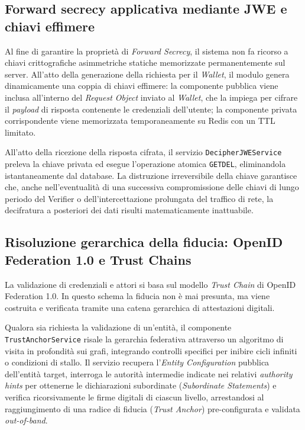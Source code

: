 \subsection{Forward secrecy applicativa mediante JWE e chiavi effimere}
Al fine di garantire la proprietà di \textit{Forward Secrecy}, il sistema non fa ricorso a chiavi crittografiche asimmetriche statiche memorizzate permanentemente sul server. All'atto della generazione della richiesta per il \textit{Wallet}, il modulo genera dinamicamente una coppia di chiavi effimere: la componente pubblica viene inclusa all'interno del \textit{Request Object} inviato al \textit{Wallet}, che la impiega per cifrare il \textit{payload} di risposta contenente le credenziali dell'utente; la componente privata corrispondente viene memorizzata temporaneamente su Redis con un TTL limitato. 

All'atto della ricezione della risposta cifrata, il servizio \texttt{DecipherJWEService} preleva la chiave privata ed esegue l'operazione atomica \texttt{GETDEL}, eliminandola istantaneamente dal database. La distruzione irreversibile della chiave garantisce che, anche nell'eventualità di una successiva compromissione delle chiavi di lungo periodo del Verifier o dell'intercettazione prolungata del traffico di rete, la decifratura a posteriori dei dati risulti matematicamente inattuabile.

\subsection{Risoluzione gerarchica della fiducia: OpenID Federation 1.0 e Trust Chains}
La validazione di credenziali e attori si basa sul modello \textit{Trust Chain} di OpenID Federation 1.0. In questo schema la fiducia non è mai presunta, ma viene costruita e verificata tramite una catena gerarchica di attestazioni digitali.

Qualora sia richiesta la validazione di un'entità, il componente \texttt{TrustAnchorService} risale la gerarchia federativa attraverso un algoritmo di visita in profondità sui grafi, integrando controlli specifici per inibire cicli infiniti o condizioni di stallo. Il servizio recupera l'\textit{Entity Configuration} pubblica dell'entità target, interroga le autorità intermedie indicate nei relativi \textit{authority hints} per ottenerne le dichiarazioni subordinate (\textit{Subordinate Statements}) e verifica ricorsivamente le firme digitali di ciascun livello, arrestandosi al raggiungimento di una radice di fiducia (\textit{Trust Anchor}) pre-configurata e validata \textit{out-of-band}.

